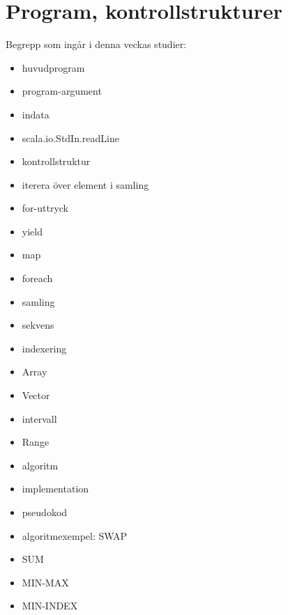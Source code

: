 \chapter{Program, kontrollstrukturer}\label{chapter:W02}
Begrepp som ingår i denna veckas studier:
\begin{itemize}[noitemsep,label={$\square$},leftmargin=*]
\item huvudprogram
\item program-argument
\item indata
\item scala.io.StdIn.readLine
\item kontrollstruktur
\item iterera över element i samling
\item for-uttryck
\item yield
\item map
\item foreach
\item samling
\item sekvens
\item indexering
\item Array
\item Vector
\item intervall
\item Range
\item algoritm
\item implementation
\item pseudokod
\item algoritmexempel: SWAP
\item SUM
\item MIN-MAX
\item MIN-INDEX\end{itemize}
